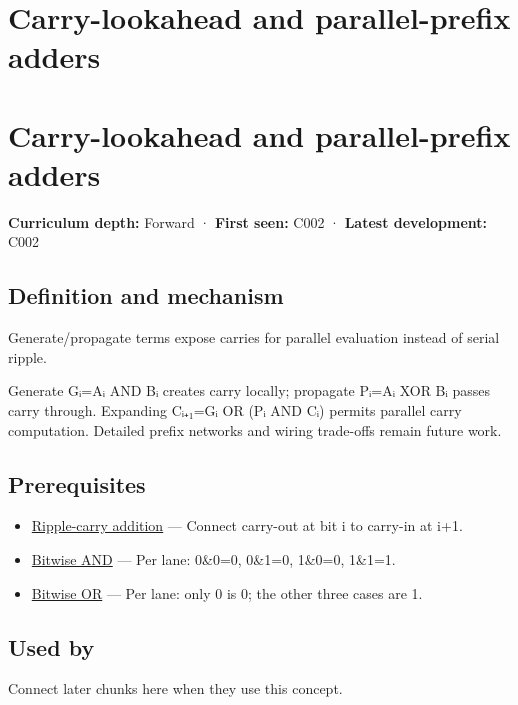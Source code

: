 \hypertarget{appendix-b5c46b2d94ff}{}
\section*{Carry-lookahead and parallel-prefix adders}
\section{Carry-lookahead and parallel-prefix adders}\label{appendix-b5c46b2d94ff-carry-lookahead-and-parallel-prefix-adders}

\textbf{Curriculum depth:} Forward · \textbf{First seen:} C002 · \textbf{Latest development:} C002

\subsection{Definition and mechanism}\label{appendix-b5c46b2d94ff-definition-and-mechanism}

Generate/propagate terms expose carries for parallel evaluation instead of serial ripple.

Generate Gᵢ=Aᵢ AND Bᵢ creates carry locally; propagate Pᵢ=Aᵢ XOR Bᵢ passes carry through. Expanding Cᵢ₊₁=Gᵢ OR (Pᵢ AND Cᵢ) permits parallel carry computation. Detailed prefix networks and wiring trade-offs remain future work.

\subsection{Prerequisites}\label{appendix-b5c46b2d94ff-prerequisites}

\begin{itemize}
\tightlist
\item
  \hyperref[appendix-17917d9fdbe3]{Ripple-carry addition} --- Connect carry-out at bit i to carry-in at i+1.
\item
  \hyperref[appendix-68b52453737c]{Bitwise AND} --- Per lane: 0\&0=0, 0\&1=0, 1\&0=0, 1\&1=1.
\item
  \hyperref[appendix-a427ce8ce8a6]{Bitwise OR} --- Per lane: only 0 is 0; the other three cases are 1.
\end{itemize}

\subsection{Used by}\label{appendix-b5c46b2d94ff-used-by}

Connect later chunks here when they use this concept.

